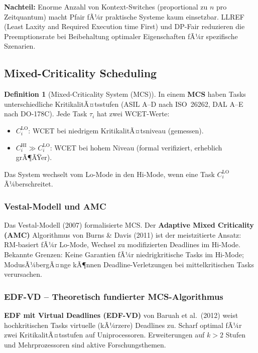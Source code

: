 ﻿\documentclass[a4paper,12pt]{report}
\theoremstyle{definition}
\newtheorem{definition}{Definition}[chapter]
\begin{document}
\textbf{Nachteil:} Enorme Anzahl von Kontext-Switches (proportional zu $n$
pro Zeitquantum) macht Pfair fÃ¼r praktische Systeme kaum einsetzbar.
LLREF (Least Laxity and Required Execution time First) und DP-Fair
reduzieren die Preemptionsrate bei Beibehaltung optimaler Eigenschaften
fÃ¼r spezifische Szenarien.

\subsection{Mixed-Criticality Scheduling}

\begin{definition}[Mixed-Criticality System (MCS)]
	In einem \textbf{MCS} haben Tasks unterschiedliche KritikalitÃ¤tsstufen
	(ASIL A--D nach ISO~26262, DAL A--E nach DO-178C). Jede Task $\tau_i$
	hat zwei WCET-Werte:
	\begin{itemize}
		\item $C_i^{\mathrm{LO}}$: WCET bei niedrigem KritikalitÃ¤tsniveau (gemessen).
		\item $C_i^{\mathrm{HI}} \gg C_i^{\mathrm{LO}}$: WCET bei hohem Niveau
		      (formal verifiziert, erheblich grÃ¶ÃŸer).
	\end{itemize}
	Das System wechselt vom Lo-Mode in den Hi-Mode, wenn eine Task $C_i^{\mathrm{LO}}$
	Ã¼berschreitet.
\end{definition}

\subsubsection{Vestal-Modell und AMC}

Das Vestal-Modell (2007) formalisierte MCS. Der \textbf{Adaptive Mixed Criticality
(AMC)} Algorithmus von Burns \& Davis (2011) ist der meistzitierte Ansatz:
RM-basiert fÃ¼r Lo-Mode, Wechsel zu modifizierten Deadlines im Hi-Mode.
Bekannte Grenzen: Keine Garantien fÃ¼r niedrigkritische Tasks im Hi-Mode;
ModusÃ¼bergÃ¤nge kÃ¶nnen Deadline-Verletzungen bei mittelkritischen Tasks
verursachen.

\subsubsection{EDF-VD -- Theoretisch fundierter MCS-Algorithmus}

\textbf{EDF mit Virtual Deadlines (EDF-VD)} von Baruah et al.\ (2012) weist
hochkritischen Tasks virtuelle (kÃ¼rzere) Deadlines zu. Scharf optimal fÃ¼r
zwei KritikalitÃ¤tsstufen auf Uniprocessoren. Erweiterungen auf $k > 2$ Stufen
und Mehrprozessoren sind aktive Forschungsthemen.
\end{document}
